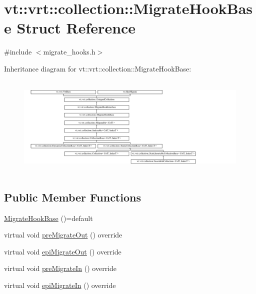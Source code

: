 \hypertarget{structvt_1_1vrt_1_1collection_1_1_migrate_hook_base}{}\section{vt\+:\+:vrt\+:\+:collection\+:\+:Migrate\+Hook\+Base Struct Reference}
\label{structvt_1_1vrt_1_1collection_1_1_migrate_hook_base}


{\ttfamily \#include $<$migrate\+\_\+hooks.\+h$>$}

Inheritance diagram for vt\+:\+:vrt\+:\+:collection\+:\+:Migrate\+Hook\+Base\+:\begin{figure}[H]
\begin{center}
\leavevmode
\includegraphics[height=4.873803cm]{structvt_1_1vrt_1_1collection_1_1_migrate_hook_base}
\end{center}
\end{figure}
\subsection*{Public Member Functions}
\begin{DoxyCompactItemize}
\item 
\hyperlink{structvt_1_1vrt_1_1collection_1_1_migrate_hook_base_abed6481a2a5fd65b9c50bf190a9b8282}{Migrate\+Hook\+Base} ()=default
\item 
virtual void \hyperlink{structvt_1_1vrt_1_1collection_1_1_migrate_hook_base_aefb49af057c90295e89ae029fd7ba8bb}{pre\+Migrate\+Out} () override
\item 
virtual void \hyperlink{structvt_1_1vrt_1_1collection_1_1_migrate_hook_base_aa5bdff485cc373da8828e845a45bccb6}{epi\+Migrate\+Out} () override
\item 
virtual void \hyperlink{structvt_1_1vrt_1_1collection_1_1_migrate_hook_base_aca3947e263443c0460cea7d75fbae2bf}{pre\+Migrate\+In} () override
\item 
virtual void \hyperlink{structvt_1_1vrt_1_1collection_1_1_migrate_hook_base_a9b687a96cbba5d12d1c87aee0e985997}{epi\+Migrate\+In} () override
\end{DoxyCompactItemize}
